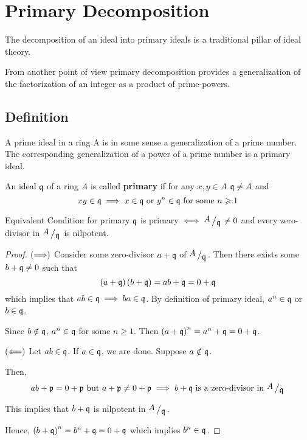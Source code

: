 \chapter{Primary Decomposition}
\label{ch:book_04_primary_decomposition}

The decomposition of an ideal into primary ideals is a traditional
pillar of ideal theory.

From another point of view primary decomposition provides a generalization
of the factorization of an integer as a product of prime-powers.

\section{Definition}

A prime ideal in a ring A is in some sense a generalization of
a prime number.
The corresponding generalization of a power of a prime number is a
primary ideal.

\begin{definition}{}{}
\label{def:primary_ideal}
	An ideal \(\mathfrak{q}\) of a ring \(A\) is called \textbf{primary} if
	for any \(x, y \in A\)
	\(\mathfrak{q} \neq A\) and
	\[
		xy \in \mathfrak{q} \implies x \in \mathfrak{q} \text{ or } y^n \in \mathfrak{q}
		\text{ for some } n \geqslant 1
	\]
\end{definition}

\begin{proposition}{Equivalent Condition for primary}{}
\label{prop:4_0}
	\(\mathfrak{q}\) is primary \(\iff \bigslant{A}{\mfq} \neq 0\) and
	every zero-divisor in \(\bigslant{A}{\mfq}\) is nilpotent.
\end{proposition}

\begin{proof}
	\(\left( \Longrightarrow \right)\)
	Consider some zero-divisor \(a + \mathfrak{q}\) of \(\bigslant{A}{\mfq}\).
	Then there exists some \(b + \mathfrak{q} \neq 0\) such that
	\[
		\left( a + \mathfrak{q} \right)\left( b + \mathfrak{q} \right) = ab + \mathfrak{q} = 0 + \mathfrak{q}
	\]
	which implies that \(ab \in \mathfrak{q} \implies ba \in \mathfrak{q}\).
	By definition of primary ideal, \(a^n \in \mathfrak{q}\) or \(b \in \mathfrak{q}\).

	Since \(b \notin \mathfrak{q}\), \(a^n \in \mathfrak{q}\) for some \(n \geq 1\).
	Then \(\left( a + \mathfrak{q} \right)^n = a^n + \mathfrak{q} = 0 + \mathfrak{q}\).

	\(\left( \Longleftarrow \right)\)
	Let \(ab \in \mathfrak{q}\).
	If \(a \in \mathfrak{q}\), we are done.
	Suppose \(a \notin \mathfrak{q}\).

	Then,
	\[
		ab + \mfp = 0 + \mfp \text{ but } a + \mfp \neq 0 + \mfp
		\implies b + \mfq \text{ is a zero-divisor in } \bigslant{A}{\mfq}
	\]

	This implies that \(b + \mathfrak{q}\) is nilpotent in \(\bigslant{A}{\mfq}\).

	Hence, \(\left( b + \mathfrak{q} \right)^n = b^n + \mathfrak{q} = 0 + \mathfrak{q}\) which
	implies \(b^n \in \mathfrak{q}\).
\end{proof}



